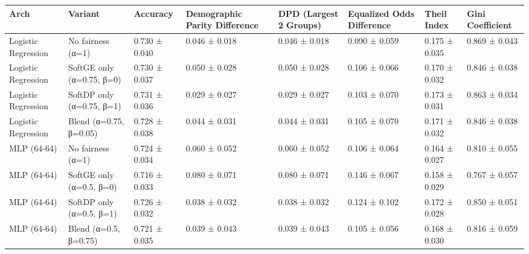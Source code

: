 \begin{tabular}{llllllll}
\toprule
Arch & Variant & Accuracy & Demographic Parity Difference & DPD (Largest 2 Groups) & Equalized Odds Difference & Theil Index & Gini Coefficient \\
\midrule
Logistic Regression & No fairness (α=1) & 0.730 ± 0.040 & 0.046 ± 0.018 & 0.046 ± 0.018 & 0.090 ± 0.059 & 0.175 ± 0.035 & 0.869 ± 0.043 \\
Logistic Regression & SoftGE only (α=0.75, β=0) & 0.730 ± 0.037 & 0.050 ± 0.028 & 0.050 ± 0.028 & 0.106 ± 0.066 & 0.170 ± 0.032 & 0.846 ± 0.038 \\
Logistic Regression & SoftDP only (α=0.75, β=1) & 0.731 ± 0.036 & 0.029 ± 0.027 & 0.029 ± 0.027 & 0.103 ± 0.070 & 0.173 ± 0.031 & 0.863 ± 0.034 \\
Logistic Regression & Blend (α=0.75, β=0.05) & 0.728 ± 0.038 & 0.044 ± 0.031 & 0.044 ± 0.031 & 0.105 ± 0.070 & 0.171 ± 0.032 & 0.846 ± 0.038 \\
MLP (64-64) & No fairness (α=1) & 0.724 ± 0.034 & 0.060 ± 0.052 & 0.060 ± 0.052 & 0.106 ± 0.064 & 0.164 ± 0.027 & 0.810 ± 0.055 \\
MLP (64-64) & SoftGE only (α=0.5, β=0) & 0.716 ± 0.033 & 0.080 ± 0.071 & 0.080 ± 0.071 & 0.146 ± 0.067 & 0.158 ± 0.029 & 0.767 ± 0.057 \\
MLP (64-64) & SoftDP only (α=0.5, β=1) & 0.726 ± 0.032 & 0.038 ± 0.032 & 0.038 ± 0.032 & 0.124 ± 0.102 & 0.172 ± 0.028 & 0.850 ± 0.051 \\
MLP (64-64) & Blend (α=0.5, β=0.75) & 0.721 ± 0.035 & 0.039 ± 0.043 & 0.039 ± 0.043 & 0.105 ± 0.056 & 0.168 ± 0.030 & 0.816 ± 0.059 \\
\bottomrule
\end{tabular}
